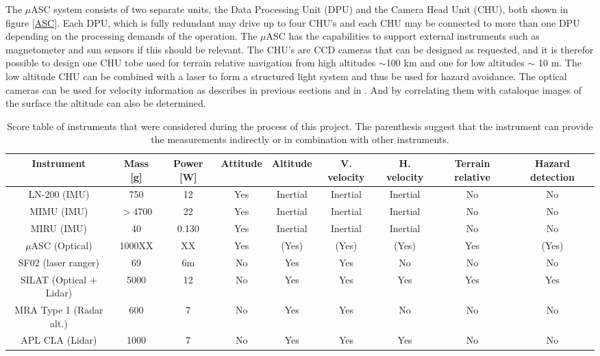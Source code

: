 The $\mu$ASC system consists of two separate units, the Data Processing Unit (DPU) and the Camera Head Unit (CHU),  both shown in figure \ref{ASC}. Each DPU, which is fully redundant may drive up to four CHU's and each CHU may be connected to more than one DPU depending on the processing demands of the operation. The $\mu$ASC has the capabilities to support external instruments such as magnetometer and sun sensors if this should be relevant. The CHU's are CCD cameras that can be designed as requested, and it is therefor possible to design one CHU tobe used for terrain relative navigation from high altitudes $\sim$100 km and one for low altitudes $\sim$ 10 m. The low altitude CHU can be combined with a laser to form a structured light system and thus be used for hazard avoidance. The optical cameras can be used for velocity information as describes in previous sections and in \citep{alessandro}. And by correlating them with cataloque images of the surface the altitude can also be determined. 


\begin{table}
\begin{flushleft}

\begin{tabular}{|c|c|c|c|c|c|c|c|c|}
\hline 
Instrument & Mass [g] & Power [W] &Attitude & Altitude & V. velocity & H. velocity & Terrain relative & Hazard detection\\ 
\hline
LN-200 (IMU) & 750 & 12 & Yes & Inertial & Inertial & Inertial & No & No\\
\hline
MIMU (IMU) & $>$4700 & 22 & Yes& Inertial & Inertial & Inertial & No & No\\
\hline

MIRU (IMU)& 40 & 0.130 & Yes& Inertial & Inertial & Inertial & No & No\\
\hline
$\mu$ASC (Optical)  & 1000XX & XX& Yes & (Yes) & (Yes) & (Yes) & Yes & (Yes)\\
\hline
SF02 (laser ranger) & 69  & 6m & No & Yes  & Yes & No & No & No\\
\hline
SILAT (Optical + Lidar) & 5000  & 12 & No & Yes & Yes & Yes & Yes & Yes \\
\hline
MRA Type 1 (Radar alt.) & 600 & 7& No & Yes  & Yes & No & No & No \\
\hline
APL CLA (Lidar) & 1000 & 7 & No & Yes & Yes & Yes & No& No \\
\hline

 

\end{tabular}
\caption{Score table of instruments that were considered during the process of this project. The parenthesis suggest that the instrument can provide the measurements indirectly or in combination with other instruments. }
\label{tab:sensors}
\end{flushleft}
\end{table}


